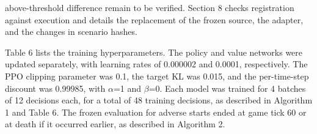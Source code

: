 \documentclass{article}
\begin{document}
above-threshold difference remain to be verified. Section 8 checks registration against execution and details the replacement of the frozen source, the adapter, and the changes in scenario hashes.


Table 6 lists the training hyperparameters. The policy and value networks were updated separately, with learning rates of 0.000002 and 0.0001, respectively. The PPO clipping parameter was 0.1, the target KL was 0.015, and the per-time-step discount was 0.99985, with \ensuremath{\alpha}=1 and \ensuremath{\beta}=0. Each model was trained for 4 batches of 12 decisions each, for a total of 48 training decisions, as described in Algorithm 1 and Table 6. The frozen evaluation for adverse starts ended at game tick 60 or at death if it occurred earlier, as described in Algorithm 2.

\begingroup\small\setlength{\tabcolsep}{3pt}
\end{document}
